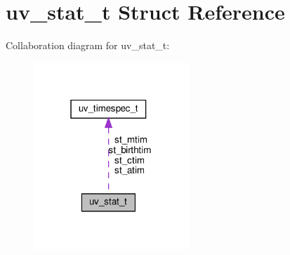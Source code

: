 \hypertarget{structuv__stat__t}{}\section{uv\+\_\+stat\+\_\+t Struct Reference}
\label{structuv__stat__t}


Collaboration diagram for uv\+\_\+stat\+\_\+t\+:
\nopagebreak
\begin{figure}[H]
\begin{center}
\leavevmode
\includegraphics[width=166pt]{structuv__stat__t__coll__graph}
\end{center}
\end{figure}
